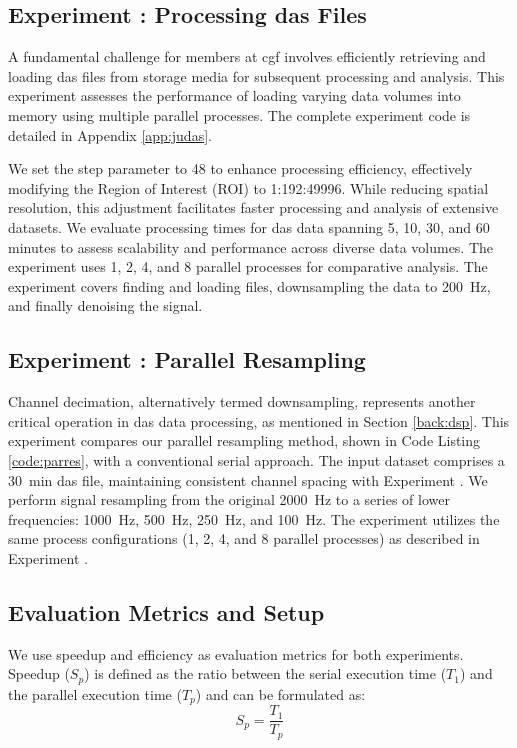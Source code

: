 \subsection{Experiment : Processing \acrshort{das} Files}
A fundamental challenge for members at \acrshort{cgf} involves efficiently retrieving and loading \acrshort{das} files from storage media for subsequent processing and analysis. This experiment assesses the performance of loading varying data volumes into memory using multiple parallel processes. The complete experiment code is detailed in Appendix \ref{app:judas}.

We set the step parameter to 48 to enhance processing efficiency, effectively modifying the Region of Interest (ROI) to 1:192:49996. While reducing spatial resolution, this adjustment facilitates faster processing and analysis of extensive datasets. We evaluate processing times for \acrshort{das} data spanning 5, 10, 30, and 60 minutes to assess scalability and performance across diverse data volumes. The experiment uses 1, 2, 4, and 8 parallel processes for comparative analysis. The experiment covers finding and loading files, downsampling the data to \qty{200}{\hertz}, and finally denoising the signal.

\subsection{Experiment : Parallel Resampling}
Channel decimation, alternatively termed downsampling, represents another critical operation in \acrshort{das} data processing, as mentioned in Section \ref{back:dsp}. This experiment compares our parallel resampling method, shown in Code Listing \ref{code:parres}, with a conventional serial approach. The input dataset comprises a \qty{30}{\minute} \acrshort{das} file, maintaining consistent channel spacing with Experiment . We perform signal resampling from the original \qty{2000}{\hertz} to a series of lower frequencies: \qty{1000}{\hertz}, \qty{500}{\hertz}, \qty{250}{\hertz}, and \qty{100}{\hertz}. The experiment utilizes the same process configurations (1, 2, 4, and 8 parallel processes) as described in Experiment .

\subsection{Evaluation Metrics and Setup}

We use speedup and efficiency as evaluation metrics for both experiments. Speedup ($S_p$) is defined as the ratio between the serial execution time ($T_1$) and the parallel execution time ($T_p$) and can be formulated as:
\begin{equation}
    S_p = \frac{T_1}{T_p}
\end{equation}


